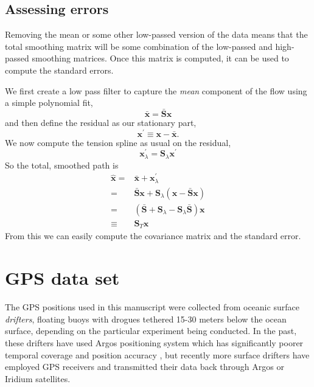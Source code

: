 \documentclass[10pt,journal]{IEEEtran}
\begin{document}
\subsection{Assessing errors}
\label{sec:errors_wit_mean}

Removing the mean or some other low-passed version of the data means that the total smoothing matrix will be some combination of the low-passed and high-passed smoothing matrices. Once this matrix is computed, it can be used to compute the standard errors.

We first create a low pass filter to capture the \emph{mean} component of the flow using a simple polynomial fit,
\begin{equation}
\bar{\mathbf{x}} = \bar{\mathbf{S}} \mathbf{x}
\end{equation}
and then define the residual as our stationary part,
\begin{equation}
\mathbf{x}^\prime \equiv \mathbf{x} - \bar{\mathbf{x}}.
\end{equation}
We now compute the tension spline as usual on the residual,
\begin{equation}
\mathbf{x}^\prime_\lambda = \mathbf{S}_\lambda \mathbf{x}^\prime
\end{equation}
So the total, smoothed path is
\begin{align}
\hat{\mathbf{x}} =& \bar{\mathbf{x}} + \mathbf{x}^\prime_\lambda \\
=& \bar{\mathbf{S}} \mathbf{x} + \mathbf{S}_\lambda \left( \mathbf{x} - \bar{\mathbf{S}} \mathbf{x} \right) \\
=& \left(\bar{\mathbf{S}} + \mathbf{S}_\lambda - \mathbf{S}_\lambda \bar{\mathbf{S}}\right)\mathbf{x} \\
\equiv& \mathbf{S}_T \mathbf{x}
\end{align}
From this we can easily compute the covariance matrix and the standard error.

\section{GPS data set}
\label{sec:drifter_data_set}

The GPS positions used in this manuscript were collected from oceanic surface \emph{drifters}, floating buoys with drogues tethered 15-30 meters below the ocean surface, depending on the particular experiment being conducted. In the past, these drifters have used Argos positioning system which has significantly poorer temporal coverage and position accuracy \cite{elipot2016-jgr}, but recently more surface drifters have employed GPS receivers and transmitted their data back through Argos or Iridium satellites.
\end{document}

